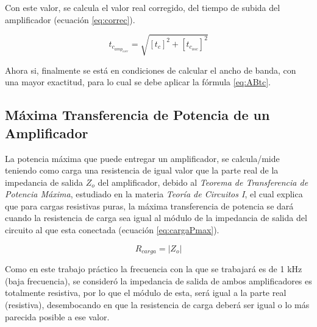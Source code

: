 Con este valor, se calcula el valor real corregido, del tiempo de subida del amplificador (ecuación \ref{eq:correc}).

\begin{equation}
    t_{c_{amp_{corr}}} = \sqrt{[t_c]^2 + [t_{c_{osc}}]^2}
    \label{eq:correc}
\end{equation}

Ahora si, finalmente se está en condiciones de calcular el ancho de banda, con una mayor exactitud, para lo cual se debe aplicar la fórmula \ref{eq:ABtc}.


\newpage
\subsection{Máxima Transferencia de Potencia de un Amplificador}
\label{sec:MaxPot}

La potencia máxima que puede entregar un amplificador, se calcula/mide teniendo como carga una resistencia de igual valor que la parte real de la impedancia de salida $Z_o$ del amplificador, debido al \textit{Teorema de Transferencia de Potencia Máxima}, estudiado en la materia \textit{Teoría de Circuitos I}, el cual explica que para cargas resistivas puras, la máxima transferencia de potencia se dará cuando la resistencia de carga sea igual al módulo de la impedancia de salida del circuito al que esta conectada (ecuación \ref{eq:cargaPmax}).

\begin{equation}
    R_{carga} = |Z_o| 
    \label{eq:cargaPmax}
\end{equation}

Como en este trabajo práctico la frecuencia con la que se trabajará es de 1 kHz (baja frecuencia), se consideró la impedancia de salida de ambos amplificadores es totalmente resistiva, por lo que el módulo de esta, será igual a la parte real (resistiva), desembocando en que la resistencia de carga deberá ser igual o lo más parecida posible a ese valor.

